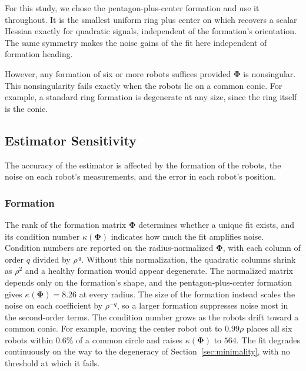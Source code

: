 \documentclass[lettersize,journal]{IEEEtran}
\begin{document}
For this study, we chose the pentagon-plus-center formation and use it
throughout. It is the smallest uniform ring plus center on which \cite{4}
recovers a scalar Hessian exactly for quadratic signals, independent of
the formation's orientation. The same symmetry makes the noise gains of
the fit here independent of formation heading.

However, any formation of six or more robots suffices provided
$\boldsymbol{\Phi}$ is nonsingular. This nonsingularity fails exactly
when the robots lie on a common conic. For example, a standard ring
formation is degenerate at any size, since the ring itself is the
conic.


\subsection{Estimator Sensitivity}
\label{sec:sensitivity}

The accuracy of the estimator is affected by the formation of the
robots, the noise on each robot's measurements, and the error in each
robot's position.

\subsubsection{Formation}
The rank of the formation matrix $\boldsymbol{\Phi}$ determines whether
a unique fit exists, and its condition number $\kappa(\boldsymbol{\Phi})$
indicates how much the fit amplifies noise. Condition numbers are
reported on the radius-normalized $\boldsymbol{\Phi}$, with each column
of order $q$ divided by $\rho^{\,q}$. Without this normalization, the
quadratic columns shrink as $\rho^{2}$ and a healthy formation would
appear degenerate. The normalized matrix depends only on the formation's
shape, and the pentagon-plus-center formation gives
$\kappa(\boldsymbol{\Phi}) = 8.26$ at every radius. The size of the formation instead scales the noise on each
coefficient by $\rho^{-q}$, so a larger formation suppresses noise most
in the second-order terms. The condition number grows as the robots
drift toward a common conic. For example, moving the center robot out
to $0.99\rho$ places all six robots within $0.6\%$ of a common circle
and raises $\kappa(\boldsymbol{\Phi})$ to $564$. The fit degrades
continuously on the way to the degeneracy of
Section~\ref{sec:minimality}, with no threshold at which it fails.
\end{document}
